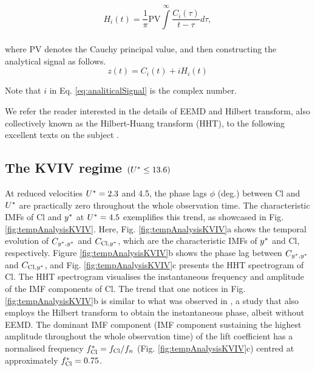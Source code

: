 \documentclass[a4paper,fleqn]{cas-sc}
\begin{document}
\begin{equation}
  H_{i} \left( t \right) = \frac{1}{\pi} \text{PV} \int\limits_{}^{\infty} \frac{C_{i} \left( \tau \right)}{t - \tau} d\tau,
  \label{eq:hilbertTransform}
\end{equation}

\noindent where PV denotes the Cauchy principal value, and then constructing the analytical signal as follows.
\begin{equation}
  z \left( t \right) = C_{i} \left( t \right) + i H_{i} \left( t \right)
  \label{eq:analiticalSignal}
\end{equation}

\noindent Note that $i$ in Eq. \ref{eq:analiticalSignal} is the complex number.

We refer the reader interested in the details of EEMD and Hilbert transform, also collectively known as the Hilbert-Huang transform (HHT), to the following excellent texts on the subject \citep{Huang2005,Huang2014}.
\subsection{The KVIV regime $\left ( U^{*} \leq 13.6 \right )$} \label{ssec:phaseLag}
At reduced velocities  $U^{*} = 2.3$ and 4.5, the phase lags  $\phi$ (deg.) between Cl and  $U^{*}$ are practically zero throughout the whole observation time. The characteristic IMFs of Cl and  $y^{*}$ at $U^{*} = 4.5$ exemplifies this trend, as showcased in Fig. \ref{fig:tempAnalysisKVIV}. Here, Fig. \ref{fig:tempAnalysisKVIV}a shows the temporal evolution of $C_{y^{*},y^{*}}$ and $C_{\text{Cl},y^{*}}$, which are the characteristic IMFs of $y^{*}$ and Cl, respectively. Figure \ref{fig:tempAnalysisKVIV}b shows the phase lag between $C_{y^{*},y^{*}}$ and $C_{\text{Cl},y^{*}}$, and Fig. \ref{fig:tempAnalysisKVIV}c presents the HHT spectrogram of Cl. The HHT spectrogram visualises the instantaneous frequency and amplitude of the IMF components of Cl. The trend that one notices in Fig. \ref{fig:tempAnalysisKVIV}b is similar to what was observed in \citet{Khalak1999}, a study that also employs the Hilbert transform to obtain the instantaneous phase, albeit without EEMD. The dominant IMF component (IMF component sustaining the highest amplitude throughout the whole observation time) of the lift coefficient has a normalised frequency $f_{\text{Cl}}^{*} = f_{\text{Cl}}/f_{n}$ (Fig. \ref{fig:tempAnalysisKVIV}c) centred at approximately $f_{\text{Cl}}^{*} = 0.75$.
\end{document}
